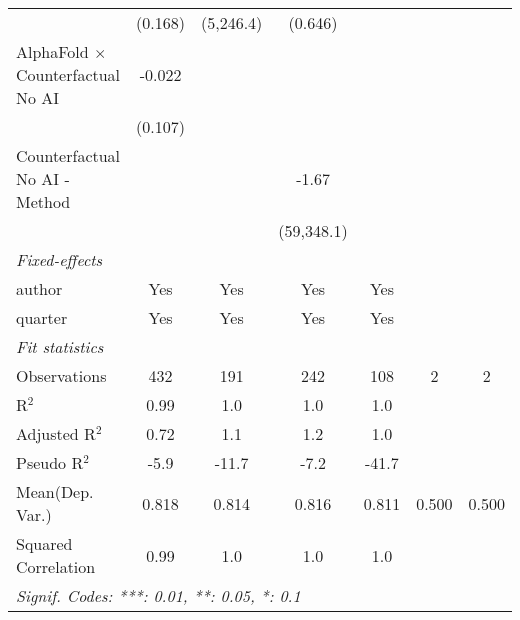 \begin{tabular}{lcccccc}
                                            & (0.168)        & (5,246.4)      & (0.646)    &                &     &   \\   
   AlphaFold $\times$ Counterfactual No AI  & -0.022         &                &            &                &     &   \\   
                                            & (0.107)        &                &            &                &     &   \\   
   Counterfactual No AI - Method            &                &                & -1.67      &                &     &   \\   
                                            &                &                & (59,348.1) &                &     &   \\   
   \midrule
   \emph{Fixed-effects}\\
   author                                   & Yes            & Yes            & Yes        & Yes            &     & \\  
   quarter                                  & Yes            & Yes            & Yes        & Yes            &     & \\  
   \midrule
   \emph{Fit statistics}\\
   Observations                             & 432            & 191            & 242        & 108            & 2   & 2\\  
   R$^2$                                    & 0.99           & 1.0            & 1.0        & 1.0            &     & \\  
   Adjusted R$^2$                           & 0.72           & 1.1            & 1.2        & 1.0            &     & \\  
   Pseudo R$^2$                             & -5.9           & -11.7          & -7.2       & -41.7          &     & \\  
Mean(Dep. Var.) & 0.818 & 0.814 & 0.816 & 0.811 & 0.500 & 0.500 \\
   Squared Correlation                      & 0.99           & 1.0            & 1.0        & 1.0            &     & \\  
   \midrule \midrule
   \multicolumn{7}{l}{\emph{Signif. Codes: ***: 0.01, **: 0.05, *: 0.1}}\\
\end{tabular}
\par\endgroup
